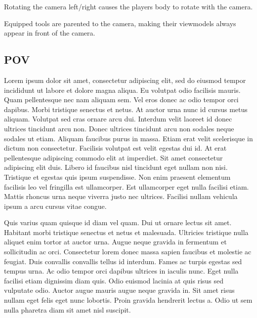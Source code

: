 \documentclass[10pt,a4paper]{article}
\begin{document}
Rotating the camera left/right causes the players body to rotate with the camera.

Equipped tools are parented to the camera, making their viewmodels always appear in front of the camera.


\subsection{POV}
Lorem ipsum dolor sit amet, consectetur adipiscing elit, sed do eiusmod tempor incididunt ut labore et dolore magna aliqua. Eu volutpat odio facilisis mauris. Quam pellentesque nec nam aliquam sem. Vel eros donec ac odio tempor orci dapibus. Morbi tristique senectus et netus. At auctor urna nunc id cursus metus aliquam. Volutpat sed cras ornare arcu dui. Interdum velit laoreet id donec ultrices tincidunt arcu non. Donec ultrices tincidunt arcu non sodales neque sodales ut etiam. Aliquam faucibus purus in massa. Etiam erat velit scelerisque in dictum non consectetur. Facilisis volutpat est velit egestas dui id. At erat pellentesque adipiscing commodo elit at imperdiet. Sit amet consectetur adipiscing elit duis. Libero id faucibus nisl tincidunt eget nullam non nisi. Tristique et egestas quis ipsum suspendisse. Non enim praesent elementum facilisis leo vel fringilla est ullamcorper. Est ullamcorper eget nulla facilisi etiam. Mattis rhoncus urna neque viverra justo nec ultrices. Facilisi nullam vehicula ipsum a arcu cursus vitae congue.

Quis varius quam quisque id diam vel quam. Dui ut ornare lectus sit amet. Habitant morbi tristique senectus et netus et malesuada. Ultricies tristique nulla aliquet enim tortor at auctor urna. Augue neque gravida in fermentum et sollicitudin ac orci. Consectetur lorem donec massa sapien faucibus et molestie ac feugiat. Duis convallis convallis tellus id interdum. Fames ac turpis egestas sed tempus urna. Ac odio tempor orci dapibus ultrices in iaculis nunc. Eget nulla facilisi etiam dignissim diam quis. Odio euismod lacinia at quis risus sed vulputate odio. Auctor augue mauris augue neque gravida in. Sit amet risus nullam eget felis eget nunc lobortis. Proin gravida hendrerit lectus a. Odio ut sem nulla pharetra diam sit amet nisl suscipit. 
\end{document}
